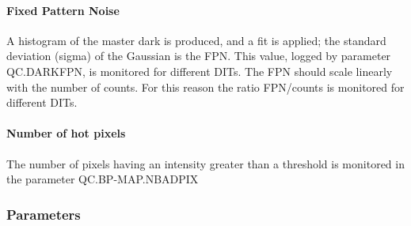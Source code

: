 \paragraph{Fixed Pattern Noise}
A histogram of the master dark is produced, and a fit is applied;
the standard deviation (sigma) of the Gaussian is the FPN. 
This value, logged by parameter QC.DARKFPN, is monitored for different 
DITs. The FPN should scale linearly with the number of counts. For this reason
the ratio FPN/counts is monitored for different DITs.

\paragraph{Number of hot pixels}
The number of pixels having an intensity greater than a threshold is monitored
in the parameter QC.BP-MAP.NBADPIX


\subsubsection{Parameters}


